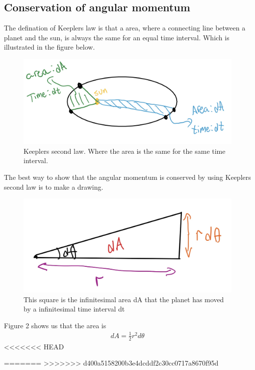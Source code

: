 \documentclass{article}
\begin{document}
\begin{multicols}{2}
\subsection{Conservation of angular momentum}
The defination of Keeplers law is that a area, where a connecting line between a planet and the sun, is always the same for an equal time interval. Which is illustrated in the figure below.
\begin{figure}[H]
	\centering
	\includegraphics[width=\linewidth]{K2L.jpg}
	\caption{Keeplers second law. Where the area is the same for the same time interval.}
	\label{fig:1bplot}
\end{figure}
The best way to show that the angular momentum is conserved by using Keeplers second law is to make a drawing.
\begin{figure}[H]
	\centering
	\includegraphics[width=\linewidth]{sketch.jpg}
	\caption{This square is the infinitesimal area dA that the planet has moved by a infinitesimal time interval dt}
	\label{fig:1bplot}
\end{figure}
Figure 2 shows us that the area is 
\begin{align}
    dA=\frac{1}{2}r^2d\theta
\end{align}
<<<<<<< HEAD


\end{multicols}

=======
>>>>>>> d400a5158200b3e4dcddf2c30cc0717a8670f95d
\end{document}
